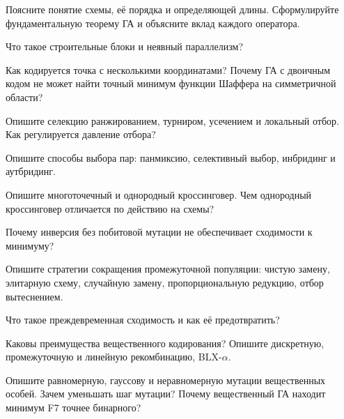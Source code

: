 \begin{questions}
\item Поясните понятие схемы, её порядка и определяющей длины. Сформулируйте фундаментальную теорему
ГА и объясните вклад каждого оператора.
\item Что такое строительные блоки и неявный параллелизм?
\item Как кодируется точка с несколькими координатами? Почему ГА с двоичным кодом не может найти
точный минимум функции Шаффера на симметричной области?
\item Опишите селекцию ранжированием, турниром, усечением и локальный отбор. Как регулируется давление
отбора?
\item Опишите способы выбора пар: панмиксию, селективный выбор, инбридинг и аутбридинг.
\item Опишите многоточечный и однородный кроссинговер. Чем однородный кроссинговер отличается по
действию на схемы?
\item Почему инверсия без побитовой мутации не обеспечивает сходимости к минимуму?
\item Опишите стратегии сокращения промежуточной популяции: чистую замену, элитарную схему, случайную
замену, пропорциональную редукцию, отбор вытеснением.
\item Что такое преждевременная сходимость и как её предотвратить?
\item Каковы преимущества вещественного кодирования? Опишите дискретную, промежуточную и линейную
рекомбинацию, BLX-$\alpha$.
\item Опишите равномерную, гауссову и неравномерную мутации вещественных особей. Зачем уменьшать шаг
мутации? Почему вещественный ГА находит минимум F7 точнее бинарного?
\end{questions}
